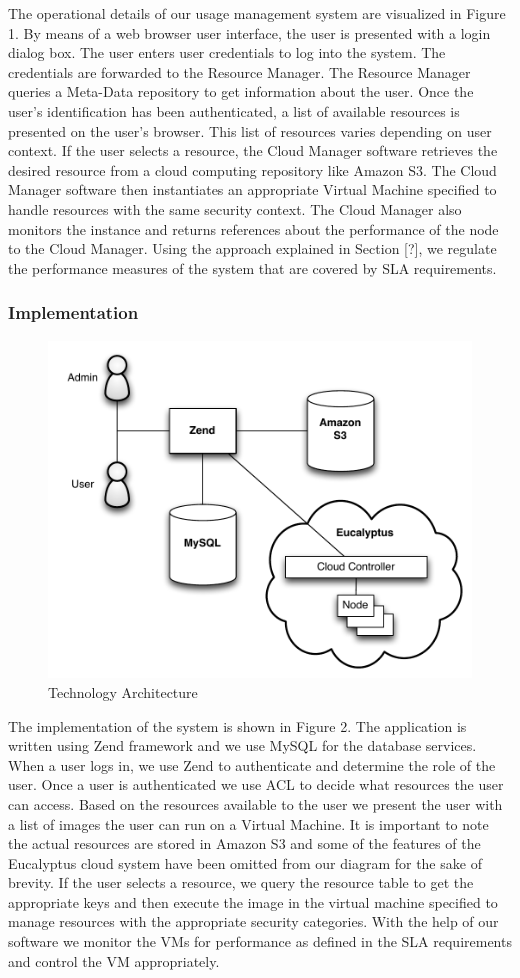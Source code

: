 \documentclass{acm_proc_article-sp}
\begin{document}
The operational details of our usage management system are visualized in Figure 1.  By means of a web browser user interface, the user is presented with a login dialog box. The user enters user credentials to log into the system. The credentials are forwarded to the Resource Manager. The Resource Manager queries a Meta-Data repository to get information about the user.  Once the user's identification has been authenticated, a list of available resources is presented on the user's browser.  This list of resources varies depending on user context. If the user selects a resource, the Cloud Manager software retrieves the desired resource from a cloud computing repository like Amazon S3.  The Cloud Manager software then instantiates an appropriate Virtual Machine specified to handle resources with the same security context. The Cloud Manager also monitors the instance and returns references about the performance of the node to the Cloud Manager.  Using the approach explained in Section [?], we regulate the performance measures of the system that are covered by SLA requirements.

\subsubsection{Implementation}
\begin{figure}[h]
  \begin{center}
    \includegraphics[width=.49\textwidth]{Technology_Architecture}
  \end{center}
  \caption{Technology Architecture}
  \label{fig:convergence}
\end{figure}
The implementation of the system is shown in Figure 2.  The application is written using Zend framework and we use MySQL for the database services. When a user logs in, we use Zend to authenticate and determine the role of the user. Once a user is authenticated we use ACL to decide what resources the user can access. Based on the resources available to the user we present the user with a list of images the user can run on a Virtual Machine. It is important to note the actual resources are stored in Amazon S3 and some of the features of the Eucalyptus cloud system have been omitted from our diagram for the sake of brevity.  If the user selects a resource, we query the resource table to get the appropriate keys and then execute the image in the virtual machine specified to manage resources with the appropriate security categories.  With the help of our software we monitor the VMs for performance as defined in the SLA requirements and control the VM appropriately.
\end{document}
